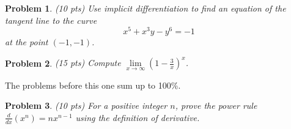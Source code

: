 \documentclass{article}
\newtheorem{problem}{Problem}
\begin{document}
\begin{problem}(10 pts)
Use implicit differentiation to find an equation of the tangent line to the curve 
\[
x^{5}+x^{3}y -y^6=-1
\] 
at the point $(-1, -1)$.
\end{problem}
\newpage 
\begin{problem}(15 pts)
Compute $\lim\limits_{x\to \infty} \left( 1- \frac{3}{x} \right)^x$. 
\end{problem}
\vskip 9cm
The problems before this one sum up to 100\%.
\begin{problem}(10 pts)
For a positive integer $n$, prove the power rule $\frac{d}{dx}(x^n)=n x^{n-1} $ using the definition of derivative.
\end{problem}
\end{document}
